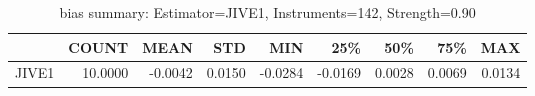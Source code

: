 \begin{table}[ht]
\centering
\caption{bias summary: Estimator=JIVE1, Instruments=142, Strength=0.90}
\begin{tabular}{lrrrrrrrr}
\toprule
 & COUNT & MEAN & STD & MIN & 25\% & 50\% & 75\% & MAX \\
\midrule
JIVE1 & 10.0000 & -0.0042 & 0.0150 & -0.0284 & -0.0169 & 0.0028 & 0.0069 & 0.0134 \\
\bottomrule
\end{tabular}
\end{table}
